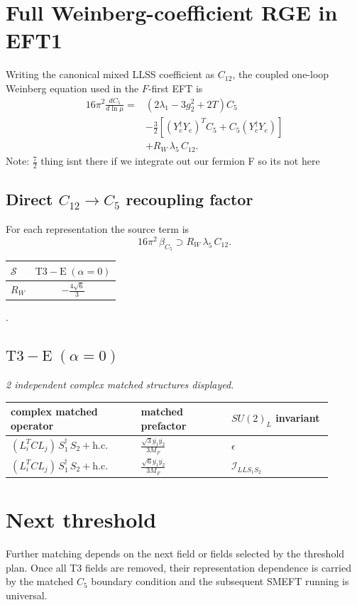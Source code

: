 \documentclass[9pt]{article}
\begin{document}
\section*{Full Weinberg-coefficient RGE in EFT1}
Writing the canonical mixed LLSS coefficient as $C_{12}$, the coupled one-loop Weinberg equation used in the $F$-first EFT is
\begin{align}
16\pi^2\frac{dC_5}{d\ln\mu}={}&(2\lambda_1-3g_2^2+2T)C_5\\
&-\frac32\left[(Y_e^\dagger Y_e)^T C_5+C_5(Y_e^\dagger Y_e)\right]\\
&+R_W\,\lambda_5\,C_{12}.
\end{align}
Note: $\frac{7}{2}$ thing isnt there if we integrate out our fermion F so its not here \subsection*{Direct $C_{12}\to C_5$ recoupling factor}
For each representation the source term is
\[16\pi^2\,\beta_{C_5}\supset R_W\,\lambda_5\,C_{12}.\]
\begin{longtable}{@{}lc@{}}
\toprule
$\mathcal{S}$ & $ \mathrm{T3-E}\;(\alpha=0) $ \\
\midrule
$R_W$ & $ - \frac{4 \sqrt{6}}{3} $ \\
\bottomrule
\end{longtable}
.
\subsection*{$ \mathrm{T3-E}\;(\alpha=0) $}
\textit{2 independent complex matched structures displayed. }
\begin{longtable}{@{}p{0.36\linewidth}p{0.25\linewidth}p{0.29\linewidth}@{}}
\toprule
complex matched operator & matched prefactor & $SU(2)_L$ invariant \\
\midrule
$ (L_i^T C L_j)\,S_1^\dagger\,S_2+\mathrm{h.c.} $ & $ \frac{\sqrt{3} \overline{y_{1}} \overline{y_{2}}}{3 M_F} $ & $ \epsilon $ \\
$ (L_i^T C L_j)\,S_1^\dagger\,S_2+\mathrm{h.c.} $ & $ \frac{\sqrt{6} \overline{y_{1}} \overline{y_{2}}}{3 M_F} $ & $ \mathcal{I}_{LLS_1S_2} $ \\
\bottomrule
\end{longtable}
\section*{Next threshold}
Further matching depends on the next field or fields selected by the threshold plan.  Once all T3 fields are removed, their representation dependence is carried by the matched $C_5$ boundary condition and the subsequent SMEFT running is universal.
\end{document}
